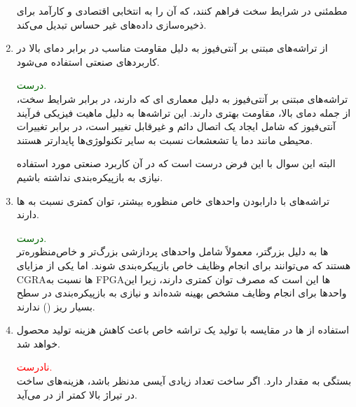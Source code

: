 \begin{enumerate}
\begin{qsolve}
		
		
	\end{qsolve}
	
	\begin{qsolve}
	مطمئنی در شرایط سخت فراهم کنند، که آن را به انتخابی اقتصادی و کارآمد برای ذخیره‌سازی داده‌های غیر حساس تبدیل می‌کند.
	\end{qsolve}
	
	
	
	
	\item 
	از تراشه‌های مبتنی بر آنتی‌فیوز به دلیل مقاومت مناسب در برابر دمای بالا در کاربردهای صنعتی استفاده می‌شود.
	\begin{qsolve}
		\textcolor{darkgreen}{درست.}\\
		تراشه‌های مبتنی بر آنتی‌فیوز به دلیل معماری ای که دارند، در برابر شرایط سخت، از جمله دمای بالا، مقاومت بهتری دارند. این تراشه‌ها به دلیل ماهیت فیزیکی فرآیند آنتی‌فیوز که شامل ایجاد یک اتصال دائم و غیرقابل تغییر است، در برابر تغییرات محیطی مانند دما یا تشعشعات نسبت به سایر تکنولوژی‌ها پایدارتر هستند.
		
		البته این سوال با این فرض درست است که در آن کاربرد صنعتی مورد استفاده نیازی به بازپیکره‌بندی نداشته باشیم.
	\end{qsolve}
	
	
	
	
	\item 
	تراشه‌های  با دارابودن واحدهای خاص منظوره بیشتر، توان کمتری نسبت به ها دارند.
	\begin{qsolve}
		\textcolor{darkgreen}{درست.}\\
		 ها
		به دلیل  ‌بزرگتر، معمولاً شامل واحدهای پردازشی بزرگ‌تر و خاص‌منظوره‌تر هستند که می‌توانند برای انجام وظایف خاص بازپیکره‌بندی شوند. اما یکی از مزایای CGRAها نسبت به FPGAها این است که مصرف توان کمتری دارند، زیرا این واحدها برای انجام وظایف مشخص بهینه شده‌اند و نیازی به بازپیکره‌بندی در سطح بسیار ریز () ندارند.
		
	\end{qsolve}
	
	
	
	
	\item 
	استفاده از ها در مقایسه با تولید یک تراشه خاص باعث کاهش هزینه تولید محصول خواهد شد.
	\begin{qsolve}
		\textcolor{red}{نادرست.}\\
		بستگی به مقدار  دارد. اگر ساخت تعداد زیادی آیسی مدنظر باشد، هزینه‌های ساخت  در تیراژ بالا کمتر از  در می‌آید.
	

\end{qsolve}
\end{enumerate}
